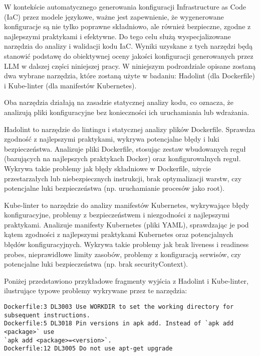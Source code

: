 W kontekście automatycznego generowania konfiguracji Infrastructure as Code (IaC) przez modele językowe, ważne jest zapewnienie, że wygenerowane konfiguracje są nie tylko poprawne składniowo, ale również bezpieczne, zgodne z najlepszymi praktykami i efektywne. Do tego celu służą wyspecjalizowane narzędzia do analizy i walidacji kodu IaC. Wyniki uzyskane z tych narzędzi będą stanowić podstawę do obiektywnej oceny jakości konfiguracji generowanych przez LLM w dalszej części niniejszej pracy. W niniejszym podrozdziale opisane zostaną dwa wybrane narzędzia, które zostaną użyte w badaniu: Hadolint \cite{hadolint} (dla Dockerfile) i Kube-linter \cite{kubelinter} (dla manifestów Kubernetes).

Oba narzędzia działają na zasadzie statycznej analizy kodu, co oznacza, że analizują pliki konfiguracyjne bez konieczności ich uruchamiania lub wdrażania.

Hadolint to narzędzie do lintingu i statycznej analizy plików Dockerfile. Sprawdza zgodność z najlepszymi praktykami, wykrywa potencjalne błędy i luki bezpieczeństwa. Analizuje pliki Dockerfile, stosując zestaw wbudowanych reguł (bazujących na najlepszych praktykach Docker) oraz konfigurowalnych reguł. Wykrywa takie problemy jak błędy składniowe w Dockerfile, użycie przestarzałych lub niebezpiecznych instrukcji, brak optymalizacji warstw, czy potencjalne luki bezpieczeństwa (np. uruchamianie procesów jako root).

Kube-linter to narzędzie do analizy manifestów Kubernetes, wykrywające błędy konfiguracyjne, problemy z bezpieczeństwem i niezgodności z najlepszymi praktykami. Analizuje manifesty Kubernetes (pliki YAML), sprawdzając je pod kątem zgodności z najlepszymi praktykami Kubernetes oraz potencjalnych błędów konfiguracyjnych. Wykrywa takie problemy jak brak liveness i readiness probes, nieprawidłowe limity zasobów, problemy z konfiguracją serwisów, czy potencjalne luki bezpieczeństwa (np. brak securityContext).

Poniżej przedstawiono przykładowe fragmenty wyjścia z Hadolint i Kube-linter, ilustrujące typowe problemy wykrywane przez te narzędzia:

\begin{lstlisting}[caption={Przykład wyników Hadolint},label={lst:example-hadolint},captionpos=b,columns=fullflexible, breaklines=true]
Dockerfile:3 DL3003 Use WORKDIR to set the working directory for subsequent instructions.
Dockerfile:5 DL3018 Pin versions in apk add. Instead of `apk add <package>` use
`apk add <package>=<version>`.
Dockerfile:12 DL3005 Do not use apt-get upgrade
\end{lstlisting}

